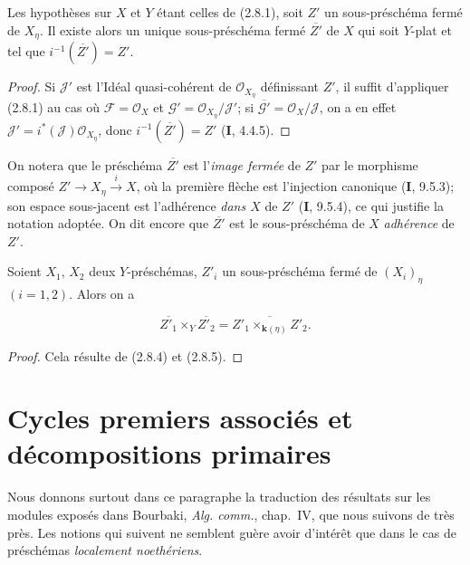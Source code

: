 \begin{proposition}[2.8.5]
\label{IV.2.8.5-fr}
Les hypothèses sur $X$ et $Y$ étant celles de \textup{(2.8.1)}, soit $Z'$ un
sous-préschéma fermé de $X_\eta$. Il existe alors un unique sous-préschéma
fermé $\overline{Z'}$ de $X$ qui soit $Y$-\textup{plat} et tel que
$i^{-1}(\overline{Z'})=Z'$.
\end{proposition}

\begin{proof}
Si $\mathcal J'$ est l'Idéal quasi-cohérent de $\mathcal O_{X_\eta}$
définissant $Z'$, il suffit d'appliquer (2.8.1) au cas où
$\mathcal F=\mathcal O_X$ et
$\mathcal G'=\mathcal O_{X_\eta}/\mathcal J'$; si
$\overline{\mathcal G'}=\mathcal O_X/\mathcal J$, on a en effet
$\mathcal J'=i^*(\mathcal J)\mathcal O_{X_\eta}$, donc
$i^{-1}(\overline{Z'})=Z'$ (\textbf{I}, 4.4.5).
\end{proof}

On notera que le préschéma $\overline{Z'}$ est l'\emph{image fermée} de $Z'$
par le morphisme composé
$Z'\longrightarrow X_\eta\xrightarrow{i}X$,
où la première flèche est l'injection canonique (\textbf{I}, 9.5.3); son espace
sous-jacent est l'adhérence \emph{dans $X$} de $Z'$ (\textbf{I}, 9.5.4), ce qui
justifie la notation adoptée. On dit encore que $\overline{Z'}$ est le
sous-préschéma de $X$ \emph{adhérence} de $Z'$.

\begin{corollary}[2.8.6]
\label{IV.2.8.6-fr}
Soient $X_1$, $X_2$ deux $Y$-préschémas, $Z'_i$ un sous-préschéma fermé de
$(X_i)_\eta$ $(i=1,2)$. Alors on a
\end{corollary}

\begin{env}[2.8.6.1]
\label{IV.2.8.6.1-fr}
\[
\overline{Z'_1}\times_Y\overline{Z'_2}
=\overline{Z'_1\times_{\mathbf{k}(\eta)}Z'_2}.
\]
\end{env}

\begin{proof}
Cela résulte de (2.8.4) et (2.8.5).
\end{proof}

\section{Cycles premiers associés et décompositions primaires}

Nous donnons surtout dans ce paragraphe la traduction des résultats sur les
modules exposés dans Bourbaki, \emph{Alg. comm.}, chap.~IV, que nous suivons de
très près. Les notions qui suivent ne semblent guère avoir d'intérêt que dans
le cas de préschémas \emph{localement noethériens}.

